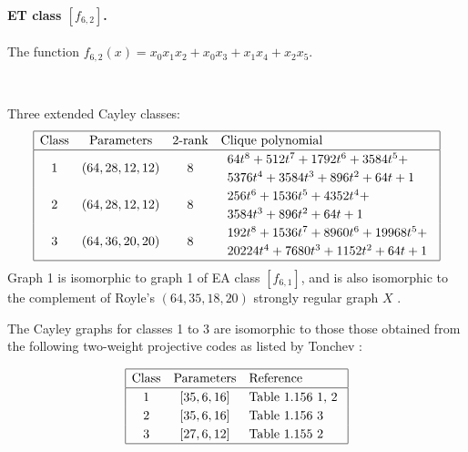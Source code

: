 \documentclass[12pt,a4paper]{article}
\begin{document}
\paragraph*{ET class $[f_{6,2}]$.}

The function
$f_{6,2}(x) = x_{0} x_{1} x_{2} + x_{0} x_{3} + x_{1} x_{4} + x_{2} x_{5}$.

~

Three extended Cayley classes:
\small{}
\begin{align*}
\def\arraystretch{1.2}
\begin{array}{|cccl|}
\hline
\text{Class} &
\text{Parameters} &
\text{2-rank} &
\text{Clique polynomial}
\\
\hline
1 &
(64, 28, 12, 12) & 8 &
\begin{array}{l}
64t^{8} + 512t^{7} + 1792t^{6} + 3584t^{5} +
\\
5376t^{4} + 3584t^{3} + 896t^{2} + 64t + 1
\end{array}
\\
2 &
(64, 28, 12, 12) & 8 &
\begin{array}{l}
256t^{6} + 1536t^{5} + 4352t^{4} +
\\
3584t^{3} + 896t^{2} + 64t + 1
\end{array}
\\
3 &
(64, 36, 20, 20) & 8 &
\begin{array}{l}
192t^{8} + 1536t^{7} + 8960t^{6} + 19968t^{5} +
\\
20224t^{4} + 7680t^{3} + 1152t^{2} + 64t + 1
\end{array}
\\
\hline
\end{array}
\end{align*}
Graph 1 is isomorphic to graph 1 of EA class $[f_{6,1}]$,
and is also isomorphic to the complement of Royle's $(64,35,18,20)$ strongly regular graph $X$
\cite{Roy08normal}.
%
%

The Cayley graphs for classes 1 to 3 are isomorphic to those those obtained from the following
two-weight projective
codes as listed by Tonchev \cite{Ton07codes}:

\begin{align*}
\begin{array}{|ccl|}
\hline
\text{Class} &
\text{Parameters} & \text{Reference}
\\
\hline
1 & [35,6,16] & \text{Table 1.156 1, 2 }
\\
2 & [35,6,16] & \text{Table 1.156 3 }
\\
3 & [27,6,12] & \text{Table 1.155 2 }
\\
\hline
\end{array}
\end{align*}
\end{document}
